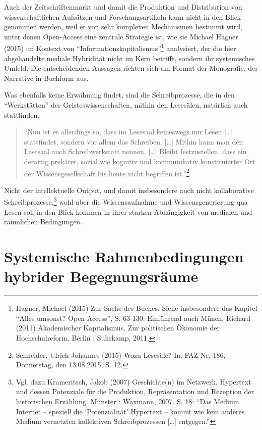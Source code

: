\documentclass[a4paper,
fontsize=11pt,
oneside,
numbers=noperiodatend,
parskip=half-,
bibliography=totoc,
final
]{scrartcl}
\begin{document}
Auch der Zeitschriftenmarkt und damit die Produktion und Distribution
von wissenschaftlichen Aufsätzen und Forschungsartikeln kann nicht in
den Blick genommen werden, weil er von sehr komplexen Mechanismen
bestimmt wird, unter denen Open-Access eine zentrale Strategie ist, wie
sie Michael Hagner (2015) im Kontext von
\enquote{Informationskapitalismus}\footnote{Hagner, Michael (2015) Zur
  Sache des Buches. Siehe insbesondere das Kapitel \enquote{Alles
  umsonst? Open Access}, S. 63-130. Einführend auch Münch, Richard
  (2011) Akademischer Kapitalismus. Zur politischen Ökonomie der
  Hochschulreform. Berlin : Suhrkamp, 2011.} analysiert, der die hier
abgehandelte mediale Hybridität nicht im Kern betrifft, sondern ihr
systemisches Umfeld. Die entscheidenden Aussagen richten sich am Format
der Monografie, der Narrative in Buchform aus.

Was ebenfalls keine Erwähnung findet, sind die Schreibprozesse, die in
den \enquote{Werkstätten} der Geisteswissenschaften, mithin den
Lesesälen, natürlich auch stattfinden.

\begin{quote}
\enquote{Nun ist es allerdings so, dass im Lesesaal keineswegs nur Lesen
{[}\ldots{}{]} stattfindet, sondern vor allem das Schreiben.
{[}\ldots{}{]} Mithin kann man den Lesesaal auch Schreibwerkstatt
nennen. {[}\ldots{}{]} Bleibt festzustellen, dass ein derartig prekärer,
sozial wie kognitiv und kommunikativ konstituierter Ort der
Wissensgesellschaft bis heute nicht begriffen ist.}\footnote{Schneider,
  Ulrich Johannes (2015) Wozu Lesesäle? In: FAZ Nr. 186, Donnerstag, den
  13.08.2015, S. 12.}
\end{quote}

Nicht der intellektuelle Output, und damit insbesondere auch nicht
kollaborative Schreibprozesse,\footnote{Vgl. dazu Krameritsch, Jakob
  (2007) Geschichte(n) im Netzwerk. Hypertext und dessen Potenziale für
  die Produktion, Repräsentation und Rezeption der historischen
  Erzählung. Münster : Waxmann, 2007. S. 18: \enquote{Das Medium
  Internet -- speziell die \enquote{Potenzialität} Hypertext -- kommt
  wie kein anderes Medium vernetzten kollektiven Schreibprozessen
  {[}\ldots{}{]} entgegen.}} wohl aber die Wissensaufnahme und
Wissensgenerierung qua Lesen soll in den Blick kommen in ihrer starken
Abhängigkeit von medialen und räumlichen Bedingungen.

\section*{Systemische Rahmenbedingungen hybrider
Begegnungsräume}\label{systemische-rahmenbedingungen-hybrider-begegnungsruxe4ume}
\end{document}
